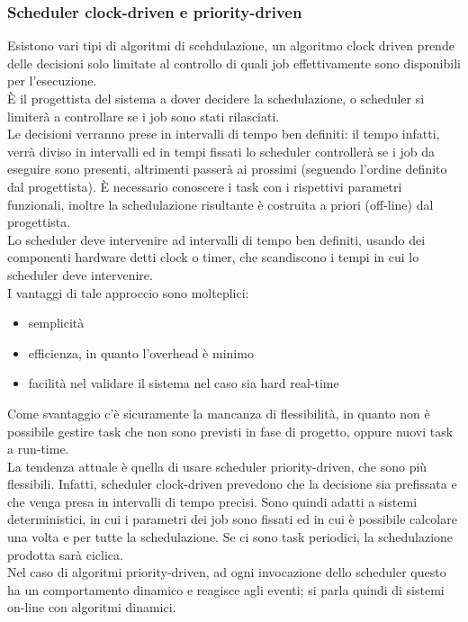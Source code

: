 \documentclass{article}
\begin{document}
\subsubsection{Scheduler clock-driven e priority-driven}
Esistono vari tipi di algoritmi di scehdulazione, un algoritmo clock driven prende delle decisioni solo limitate al controllo di quali job effettivamente sono disponibili per l'esecuzione.\\ È il progettista del sistema a dover decidere la schedulazione, o scheduler si limiterà a controllare se i job sono stati rilasciati.\\ Le decisioni verranno prese in intervalli di tempo ben definiti: il tempo infatti, verrà diviso in intervalli ed in tempi fissati lo scheduler controllerà se i job da eseguire sono presenti, altrimenti passerà ai prossimi (seguendo l'ordine definito dal progettista). È necessario conoscere i task con i rispettivi parametri funzionali, inoltre la schedulazione risultante è costruita a priori (off-line) dal progettista.\\ Lo scheduler deve intervenire ad intervalli di tempo ben definiti, usando dei componenti hardware detti clock o timer, che scandiscono i tempi in cui lo scheduler deve intervenire.\\ I vantaggi di tale approccio sono molteplici:
\begin{itemize}
\item semplicità
\item efficienza, in quanto l'overhead è minimo
\item facilità nel validare il sistema nel caso sia hard real-time
\end{itemize}
Come svantaggio c'è sicuramente la mancanza di flessibilità, in quanto non è possibile gestire task che non sono previsti in fase di progetto, oppure nuovi task a run-time.\\ La tendenza attuale è quella di usare scheduler priority-driven, che sono più flessibili. Infatti, scheduler clock-driven prevedono che la decisione sia prefissata e che venga presa in intervalli di tempo precisi. Sono quindi adatti a sistemi deterministici, in cui i parametri dei job sono fissati ed in cui è possibile calcolare una volta e per tutte la schedulazione. Se ci sono task periodici, la schedulazione prodotta sarà ciclica.\\ Nel caso di algoritmi priority-driven, ad ogni invocazione dello scheduler questo ha un comportamento dinamico e reagisce agli eventi; si parla quindi di sistemi on-line con algoritmi dinamici.
\end{document}
